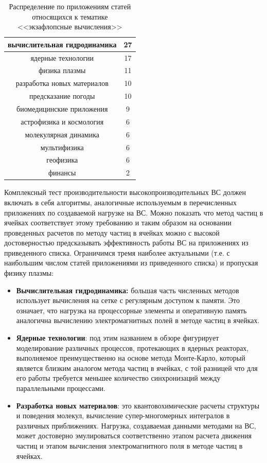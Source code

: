 \begin{table}[ht]
	\caption{Распределение по приложениям статей относящихся к тематике <<экзафлопсные вычисления>>}
	\begin{center}
		\begin{tabular}{|c|c|}
			\hline
			вычислительная гидродинамика & 27  \\ \hline 
			ядерные технологии & 17       \\ \hline  
			физика плазмы & 11  \\ \hline 
			разработка новых материалов & 10  \\ \hline 
			предсказание погоды & 10 \\ \hline 
			биомедицинские приложения & 9 \\ \hline 
			астрофизика и космология & 6  \\ \hline 
			молекулярная динамика   & 6   \\ \hline 
			мультифизика & 6              \\ \hline 
			геофизика & 6  \\ \hline 
			финансы & 2  \\ \hline 
		\end{tabular}
	\end{center}
	\label{tab_physics}
\end{table}
Комплексный тест производительности высокопроизводительных ВС должен включать в себя алгоритмы, аналогичные используемым в перечисленных приложениях по создаваемой нагрузке на ВС. Можно показать что метод частиц в ячейках соответствует этому требованию и таким образом на основании проведенных расчетов по методу частиц в ячейках можно с высокой достоверностью предсказывать эффективность работы ВС на приложениях из приведенного списка. Ограничимся тремя наиболее актуальными (т.е. с наибольшим числом статей приложениями из приведенного списка) и пропуская физику плазмы:
\begin{itemize}
	\item \textbf{Вычислительная гидродинамика:} большая часть численных методов использует вычисления на сетке с регулярным доступом к памяти. Это означает, что нагрузка на процессорные элементы и оперативную память аналогична вычислению электромагнитных полей в методе частиц в ячейках.
	\item \textbf{Ядерные технологии}: под этим названием в обзоре фигурирует моделирование различных процессов, протекающих в ядерных реакторах, выполняемое преимущественно на основе метода Монте-Карло, который является близким аналогом метода частиц в ячейках, с той разницей что для его работы требуется меньшее количество синхронизаций между параллельными процессами.
	\item \textbf{Разработка новых материалов}: это квантовохимические расчеты структуры и поведения молекул, вычисление супер-многомерных интегралов в различных приближениях. Нагрузка, создаваемая данными методами на ВС, может достоверно эмулироваться соответственно этапом расчета движения частиц и этапом вычисления электромагнитного поля в методе частиц в ячейках.
\end{itemize}	    	
